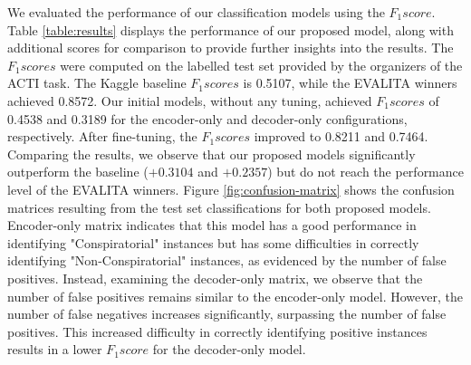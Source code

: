 \documentclass[11pt]{article}
\begin{document}
We evaluated the performance of our classification models using the $F_1 score$. 
Table \ref{table:results} displays the performance of our proposed model, 
along with additional scores for comparison to provide further insights into the results. 
The $F_1 scores$ were computed on the labelled test set provided by the organizers of the ACTI task.
The Kaggle baseline $F_1 scores$ is 0.5107, while the EVALITA winners achieved 0.8572. 
Our initial models, without any tuning, achieved $F_1 scores$ of 0.4538 and 0.3189 for the encoder-only 
and decoder-only configurations, respectively. After fine-tuning, the $F_1 scores$ improved to 0.8211 and 0.7464.
Comparing the results, we observe that our proposed models significantly 
outperform the baseline ($ +0.3104 $ and $+0.2357$) but do not reach the performance level of the EVALITA winners.
Figure \ref{fig:confusion-matrix} shows the confusion matrices resulting from 
the test set classifications for both proposed models. 
Encoder-only matrix indicates that this model has a good 
performance in identifying "Conspiratorial" instances but has some difficulties in 
correctly identifying "Non-Conspiratorial" instances, as evidenced by the number of false positives. 
Instead, examining the decoder-only matrix, we observe that the number of false positives 
remains similar to the encoder-only model. However, the number of false negatives increases 
significantly, surpassing the number of false positives. 
This increased difficulty in correctly identifying positive instances 
results in a lower $F_1 score$ for the decoder-only model.



\end{document}
